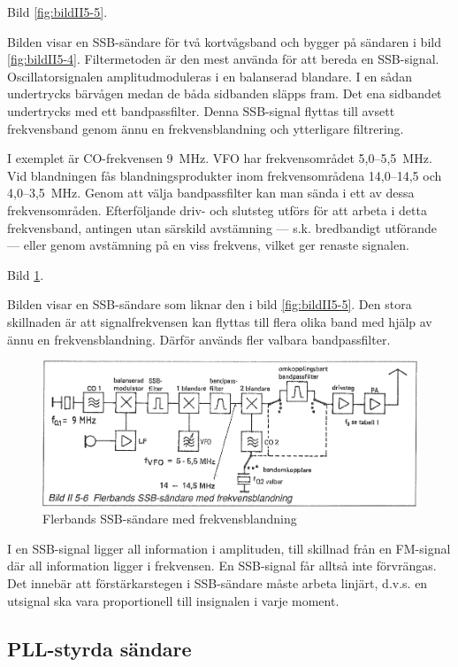 Bild \ref{fig:bildII5-5}.

Bilden visar en SSB-sändare för två kortvågsband och bygger på
sändaren i bild \ref{fig:bildII5-4}.  Filtermetoden är den mest använda för att bereda
en SSB-signal. Oscillatorsignalen amplitudmoduleras i en balanserad
blandare. I en sådan undertrycks bärvågen medan de båda sidbanden
släpps fram. Det ena sidbandet undertrycks med ett
bandpassfilter. Denna SSB-signal flyttas till avsett frekvensband
genom ännu en frekvensblandning och ytterligare filtrering.

I exemplet är CO-frekvensen 9~MHz. VFO har frekvensområdet 5,0--5,5~MHz.
Vid blandningen fås blandningsprodukter inom frekvensområdena
14,0--14,5 och 4,0--3,5~MHz. Genom att välja bandpassfilter kan man
sända i ett av dessa frekvensområden. Efterföljande driv- och
slutsteg utförs för att arbeta i detta frekvensband, antingen utan
särskild avstämning --- s.k. bredbandigt utförande --- eller genom
avstämning på en viss frekvens, vilket ger renaste signalen.

Bild \ref{fig:bildII5-6}.

Bilden visar en SSB-sändare som liknar den i bild \ref{fig:bildII5-5}. Den stora
skillnaden är att signalfrekvensen kan flyttas till flera olika band
med hjälp av ännu en frekvensblandning. Därför används fler valbara
bandpassfilter.

\begin{figure}
  \includegraphics[width=\textwidth]{images/bild_2_5-06}
  \caption{Flerbands SSB-sändare med frekvensblandning}
  \label{fig:bildII5-6}
\end{figure}

I en SSB-signal ligger all information i amplituden, till skillnad
från en FM-signal där all information ligger i frekvensen. En
SSB-signal får alltså inte förvrängas. Det innebär att
förstärkarstegen i SSB-sändare måste arbeta linjärt, d.v.s. en
utsignal ska vara proportionell till insignalen i varje moment.

\subsection{PLL-styrda sändare}

